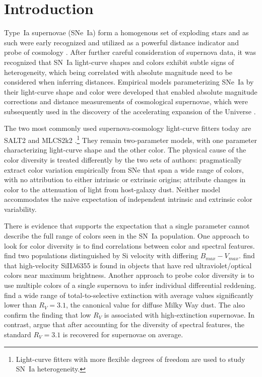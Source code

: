 \documentclass{aastex}   	%
\begin{document}
\section{Introduction}
Type~Ia supernovae (SNe~Ia) form a homogenous set of exploding stars and as such were early recognized and utilized as a powerful distance indicator 
and probe of cosmology \citep[e.g.][]{1992ARA&A..30..359B, 1993ApJ...415....1S}.  After further careful consideration of supernova data, it was recognized
that SN~Ia light-curve shapes \citep{1993ApJ...413L.105P} and colors \citep{1998A&A...331..815T} exhibit subtle signs of heterogeneity,
which being correlated with absolute magnitude
need to be considered when inferring distances.  Empirical models parameterizing SNe~Ia by their light-curve shape
and color were developed \citep{1996ApJ...473...88R, 1999ApJ...517..565P} that enabled absolute magnitude corrections
and distance measurements of cosmological supernovae,
which 
were subsequently used in the discovery of the accelerating expansion of the Universe \citep{1998AJ....116.1009R,1999ApJ...517..565P}.

The two most commonly used supernova-cosmology light-curve fitters today are SALT2 \citep{2007A&A...466...11G} and MLCS2k2
\citep{2007ApJ...659..122J}.\footnote{Light-curve fitters with more flexible degrees of freedom
\citep[e.g.][]{2008ApJ...681..482C, 2011AJ....141...19B} are used to study SN~Ia heterogeneity.}
They remain two-parameter models, with one parameter characterizing light-curve shape and the other
 color.  The physical cause of the color diversity is treated differently by the two sets of authors: 
\citet{2007A&A...466...11G} pragmatically extract color variation empirically from SNe that span a wide range of colors, with no attribution
to either intrinsic or extrinsic origins;
\citet{2007ApJ...659..122J}
attribute changes in color to the attenuation of light from host-galaxy dust. Neither model accommodates the naive expectation of independent
intrinsic and extrinsic color variability.

There is evidence that supports the expectation that a single parameter cannot describe the full range
of colors seen in the SN~Ia population.  One approach to look for color diversity is to find correlations between color and spectral features.
\citet{2009ApJ...699L.139W, 2011ApJ...729...55F} find two populations distinguished
by Si velocity with differing $B_{max}-V_{max}$.
\citet{2015MNRAS.451.1973S}
find that high-velocity SiII$\lambda$6355 is found in objects that have red ultraviolet/optical colors near maximum brightness.
Another approach to probe color diversity is to use multiple colors of a single supernova to infer individual differential reddening. 
\citet{2014ApJ...789...32B, 2015MNRAS.453.3300A} find a wide
range of total-to-selective extinction with average values significantly lower than $R_V = 3.1$,
the canonical value for diffuse Milky Way dust.
The also confirm the \citet{2011ApJ...729...55F} finding that low $R_V$ is associated with high-extinction supernovae.
In contrast, \citet{2011A&A...529L...4C} argue that after accounting for the diversity of spectral features,
the standard $R_V=3.1$ is recovered for supernovae on average.
\end{document}
